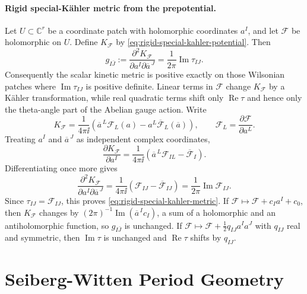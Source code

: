 \paragraph{Rigid special-K\"ahler metric from the prepotential.}
Let \(U\subset\mathbb C^r\) be a coordinate patch with holomorphic
coordinates \(a^I\), and let \(\mathcal F\) be holomorphic on \(U\).  Define
\(K_{\mathcal F}\) by \eqref{eq:rigid-special-kahler-potential}.  Then
\begin{equation}
  g_{I\bar J}:=
  \frac{\partial^2K_{\mathcal F}}{\partial a^I\partial\overline a^{\,J}}
  =
  \frac1{2\pi}\operatorname{Im}\tau_{IJ}.
  \label{eq:rigid-special-kahler-metric}
\end{equation}
Consequently the scalar kinetic metric is positive exactly on those
Wilsonian patches where \(\operatorname{Im}\tau_{IJ}\) is positive definite.
Linear terms in \(\mathcal F\) change \(K_{\mathcal F}\) by a K\"ahler
transformation, while real quadratic terms shift only \(\operatorname{Re}\tau\)
and hence only the theta-angle part of the Abelian gauge action.
Write
\[
  K_{\mathcal F}
  =
  \frac1{4\pi\ii}
  \left(
    \overline a^{\,L}\mathcal F_L(a)
    -
    a^L\overline{\mathcal F}_L(\overline a)
  \right),
  \qquad
  \mathcal F_L=\frac{\partial\mathcal F}{\partial a^L}.
\]
Treating \(a^I\) and \(\overline a^{\,J}\) as independent complex
coordinates,
\[
  \frac{\partial K_{\mathcal F}}{\partial a^I}
  =
  \frac1{4\pi\ii}
  \left(
    \overline a^{\,L}\mathcal F_{IL}
    -
    \overline{\mathcal F}_I
  \right).
\]
Differentiating once more gives
\[
  \frac{\partial^2 K_{\mathcal F}}
       {\partial a^I\partial\overline a^{\,J}}
  =
  \frac1{4\pi\ii}
  \left(
    \mathcal F_{IJ}
    -
    \overline{\mathcal F}_{IJ}
  \right)
  =
  \frac1{2\pi}\operatorname{Im}\mathcal F_{IJ}.
\]
Since \(\tau_{IJ}=\mathcal F_{IJ}\), this proves
\eqref{eq:rigid-special-kahler-metric}.  If
\(\mathcal F\mapsto \mathcal F+c_Ia^I+c_0\), then
\(K_{\mathcal F}\) changes by
\((2\pi)^{-1}\operatorname{Im}(\overline a^{\,I}c_I)\), a sum of a
holomorphic and an antiholomorphic function, so \(g_{I\bar J}\) is unchanged.
If \(\mathcal F\mapsto \mathcal F+\frac12 q_{IJ}a^Ia^J\) with \(q_{IJ}\)
real and symmetric, then \(\operatorname{Im}\tau\) is unchanged and
\(\operatorname{Re}\tau\) shifts by \(q_{IJ}\).

\section{Seiberg-Witten Period Geometry}

